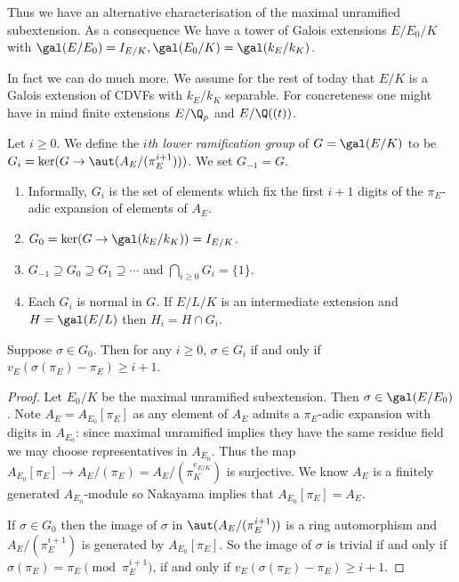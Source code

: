\documentclass[a4paper]{article}
\begin{document}
Thus we have an alternative characterisation of the maximal unramified subextension. As a consequence We have a tower of Galois extensions \(E/E_0/K\) with \(\gal(E/E_0) = I_{E/K}, \gal(E_0/K) = \gal(k_E/k_K)\).

In fact we can do much more. We assume for the rest of today that \(E/K\) is a Galois extension of CDVFs with \(k_E/k_K\) separable. For concreteness one might have in mind finite extensions \(E/\Q_p\) and \(E/\Q((t))\).

\begin{definition}
  Let \(i \geq 0\). We define the \emph{\(i\)th lower ramification group} of \(G = \gal(E/K)\) to be \(G_i = \ker(G \to \aut(A_E/(\pi_E^{i + 1})))\). We set \(G_{-1} = G\).
\end{definition}

\begin{remark}\leavevmode
  \begin{enumerate}
  \item Informally, \(G_i\) is the set of elements which fix the first \(i + 1\) digits of the \(\pi_E\)-adic expansion of elements of \(A_E\).
  \item \(G_0 = \ker(G \to \gal(k_E/k_K)) = I_{E/K}\).
  \item \(G_{-1} \supseteq G_0 \supseteq G_1 \supseteq \cdots\) and \(\bigcap_{i \geq 0} G_i = \{1\}\).
  \item Each \(G_i\) is normal in \(G\). If \(E/L/K\) is an intermediate extension and \(H = \gal(E/L)\) then \(H_i = H \cap G_i\).
  \end{enumerate}
\end{remark}

\begin{lemma}
  Suppose \(\sigma \in G_0\). Then for any \(i \geq 0\), \(\sigma \in G_i\) if and only if \(v_E(\sigma(\pi_E) - \pi_E) \geq i + 1\).
\end{lemma}

\begin{proof}
  Let \(E_0/K\) be the maximal unramified subextension. Then \(\sigma \in \gal(E/E_0)\). Note \(A_E = A_{E_0}[\pi_E]\) as any element of \(A_E\) admits a \(\pi_E\)-adic expansion with digits in \(A_{E_0}\): since maximal unramified implies they have the same residue field we may choose representatives in \(A_{E_0}\). Thus the map \(A_{E_0}[\pi_E] \to A_E/(\pi_E) = A_E/(\pi_K^{e_{E/K}})\) is surjective. We know \(A_E\) is a finitely generated \(A_{E_0}\)-module so Nakayama implies that \(A_{E_0}[\pi_E] = A_E\).

  If \(\sigma \in G_0\) then the image of \(\sigma\) in \(\aut(A_E/(\pi_E^{i + 1}))\) is a ring automorphism and \(A_E/(\pi_E^{i + 1})\) is generated by \(A_{E_0}[\pi_E]\). So the image of \(\sigma\) is trivial if and only if \(\sigma(\pi_E) = \pi_E \pmod{\pi_E^{i + 1}}\), if and only if \(v_E(\sigma(\pi_E) - \pi_E) \geq i + 1\).
\end{proof}
\end{document}
